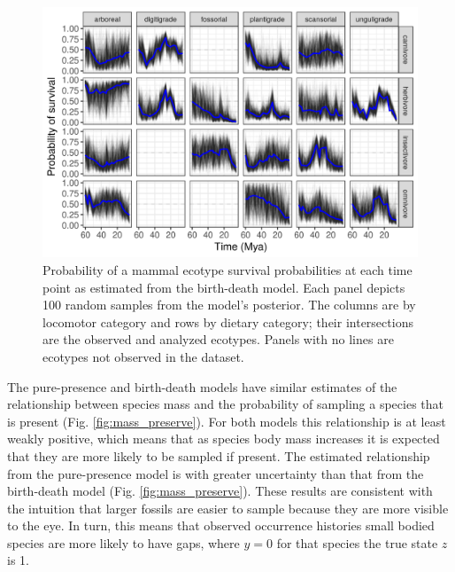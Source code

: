 \documentclass[12pt,letterpaper]{article}
\begin{document}
\begin{figure}[ht]
  \centering
  \includegraphics[width=\textwidth,height=0.4\textheight,keepaspectratio=true]{figure/ecotype_survival_bd}
  \caption[Ecotype survival probability estimated from the birth-death model]{Probability of a mammal ecotype survival probabilities at each time point as estimated from the birth-death model. Each panel depicts 100 random samples from the model's posterior. The columns are by locomotor category and rows by dietary category; their intersections are the observed and analyzed ecotypes. Panels with no lines are ecotypes not observed in the dataset.}
  \label{fig:eco_survival}
\end{figure}


The pure-presence and birth-death models have similar estimates of the relationship between species mass and the probability of sampling a species that is present (Fig. \ref{fig:mass_preserve}). For both models this relationship is at least weakly positive, which means that as species body mass increases it is expected that they are more likely to be sampled if present. The estimated relationship from the pure-presence model is with greater uncertainty than that from the birth-death model (Fig. \ref{fig:mass_preserve}). These results are consistent with the intuition that larger fossils are easier to sample because they are more visible to the eye. In turn, this means that observed occurrence histories small bodied species are more likely to have gaps, where \(y = 0\) for that species the true state \(z\) is 1. 
\end{document}
